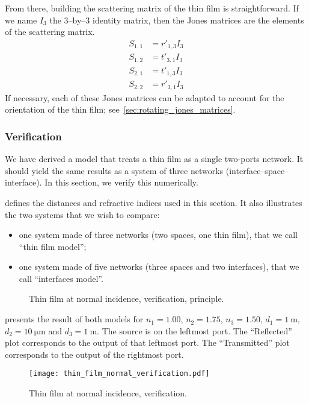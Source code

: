 From there, building the scattering matrix of the thin film is straightforward.
If we name $I_3$ the 3--by--3 identity matrix,
then the Jones matrices  
are the elements of the scattering matrix.
\begin{subequations}
    \begin{align}
        S_{1, 1} &= r'_{1, 3} I_3 \label{eq:thin_film_normal_s11} \\
        S_{1, 2} &= t'_{3, 1} I_3 \label{eq:thin_film_normal_s12} \\
        S_{2, 1} &= t'_{1, 3} I_3 \label{eq:thin_film_normal_s21} \\
        S_{2, 2} &= r'_{3, 1} I_3 \label{eq:thin_film_normal_s22}
    \end{align}
    \label{eq:thin_film_normal_sij}
\end{subequations}
If necessary, each of these Jones matrices can be adapted to account for the orientation of the thin film;
see~\vref{sec:rotating_jones_matrices}.

\subsubsection{Verification}
We have derived a model that treats a thin film as a single two-ports network.
It should yield the same results as a system of three networks
(interface--space--interface).
In this section, we verify this numerically.

 defines the distances and refractive indices used in this section.
It also illustrates the two systems that we wish to compare:
\begin{itemize}
    \item one system made of three networks (two spaces, one thin film), that we call ``thin film model'';
    \item one system made of five networks (three spaces and two interfaces), that we call ``interfaces model''.
\end{itemize}
\begin{figure}[hbtp]
    \centering
    
    \caption{Thin film at normal incidence, verification, principle.}
    \label{fig:thin_film_normal_verification_principle}
\end{figure}

 presents the result of both models for
$n_1=1.00$, $n_2=1.75$, $n_3=1.50$,
$d_1=\SI{1}{\meter}$, $d_2=\SI{10}{\micro\meter}$ and $d_3=\SI{1}{\meter}$.
The source is on the leftmost port.
The ``Reflected'' plot corresponds to the output of that leftmost port.
The ``Transmitted'' plot corresponds to the output of the rightmost port.
\begin{figure}[hbtp]
    \centering
    \texttt{[image: thin\_film\_normal\_verification.pdf]}
    \caption{Thin film at normal incidence, verification.}
    \label{fig:thin_film_normal_verification}
\end{figure}

